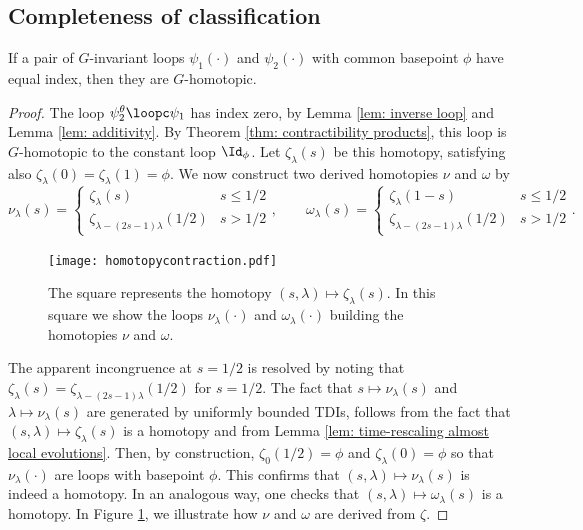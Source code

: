 \subsection{Completeness of classification}
\begin{proposition}\label{lem: completeness products}
	If a pair of $G$-invariant loops $\psi_1(\cdot)$ and $\psi_2(\cdot)$ with common basepoint $\phi$ have equal index, then they are $G$-homotopic.  
\end{proposition}
\begin{proof}
	The loop $\psi^\theta_2\loopc\psi_1$ has index zero, by Lemma \ref{lem: inverse loop} and Lemma \ref{lem: additivity}.  By Theorem \ref{thm: contractibility products}, this loop is $G$-homotopic to the constant loop $\Id_\phi$.  Let $\zeta_\lambda(s)$ be this homotopy, satisfying also $\zeta_\lambda(0)=\zeta_\lambda(1)=\phi$. 
	We now construct two derived homotopies $\nu$ and $\omega$ by 
	\begin{equation*}
		\nu_\lambda(s)=\begin{cases} \zeta_\lambda(s)  &  s\leq 1/2 \\
			\zeta_{\lambda-(2s-1)\lambda}(1/2)   &  s > 1/2
		\end{cases},\qquad
		\omega_\lambda(s)=\begin{cases} \zeta_\lambda(1-s)  &  s\leq 1/2 \\
			\zeta_{\lambda-(2s-1)\lambda}(1/2)   &  s > 1/2
		\end{cases}.
	\end{equation*}
	\begin{figure}[h] 
		\begin{center}
			\texttt{[image: homotopycontraction.pdf]}
			\caption{The square represents the homotopy $(s,\lambda)\mapsto \zeta_\lambda(s)$. In this square we show the loops $\nu_\lambda(\cdot)$ and $\omega_\lambda(\cdot)$ building the homotopies $\nu$ and $\omega$. }
			\label{fig: homotopycontraction}
		\end{center}
	\end{figure}
	The apparent incongruence at $s=1/2$ is resolved by noting that 
	$ \zeta_\lambda(s)=  \zeta_{\lambda-(2s-1)\lambda}(1/2)$ for $s=1/2$. 
	The fact that $s\mapsto \nu_\lambda(s) $ and $\lambda\mapsto \nu_\lambda(s)$ are generated by uniformly bounded TDIs, follows from the fact that $(s,\lambda)\mapsto \zeta_\lambda(s)$ is a homotopy and from Lemma \ref{lem: time-rescaling almost local evolutions}. 
	Then, by construction,  $\zeta_0(1/2)=\phi$ and $\zeta_{\lambda}(0)=\phi$ so that $\nu_\lambda(\cdot)$ are loops with basepoint $\phi$. This confirms that  $(s,\lambda)\mapsto \nu_\lambda(s)$ is indeed a homotopy.  In an analogous way, one checks that  $(s,\lambda)\mapsto \omega_\lambda(s)$ is a homotopy.   In Figure \ref{fig: homotopycontraction}, we illustrate how $\nu$ and $\omega$ are derived from $\zeta$.

\end{proof}
